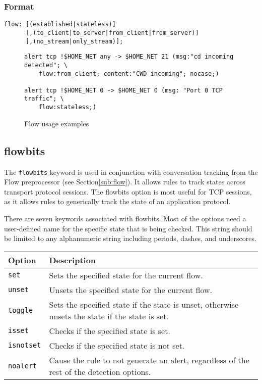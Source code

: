 \documentclass[english]{report}
\begin{document}
\subsubsection{Format}

\begin{verbatim}
flow: [(established|stateless)] 
      [,(to_client|to_server|from_client|from_server)]
      [,(no_stream|only_stream)];
\end{verbatim}
%
\begin{figure}[!hbpt]
\begin{verbatim}
alert tcp !$HOME_NET any -> $HOME_NET 21 (msg:"cd incoming detected"; \
    flow:from_client; content:"CWD incoming"; nocase;)

alert tcp !$HOME_NET 0 -> $HOME_NET 0 (msg: "Port 0 TCP traffic"; \
    flow:stateless;)
\end{verbatim}

\caption{Flow usage examples\label{flow usage examples}}
\end{figure}

\subsection{flowbits\label{flowbits}}

The \texttt{flowbits} keyword is used in conjunction with conversation
tracking from the Flow preprocessor (see Section\ref{sub:flow}).  It allows
rules to track states across transport protocol sessions.  The flowbits option
is most useful for TCP sessions, as it allows rules to generically track the
state of an application protocol.

There are seven keywords associated with flowbits. Most of the options need a
user-defined name for the specific state that is being checked.  This string
should be limited to any alphanumeric string including periods, dashes, and
underscores.

\begin{tabular}{| l | p{5in} |}
\hline
{\bf Option} & {\bf Description}\\
\hline
\hline
\texttt{set} & Sets the specified state for the current flow.\\
\hline
\texttt{unset} & Unsets the specified state for the current flow.\\
\hline
\texttt{toggle} & Sets the specified state if the state is unset, otherwise unsets the 
state if the state is set.\\
\hline
\texttt{isset} & Checks if the specified state is set.\\
\hline
\texttt{isnotset} & Checks if the specified state is not set.\\
\hline
\texttt{noalert} & Cause the rule to not generate an alert, regardless of the rest of the detection options.\\
\hline
\end{tabular}
\end{document}
